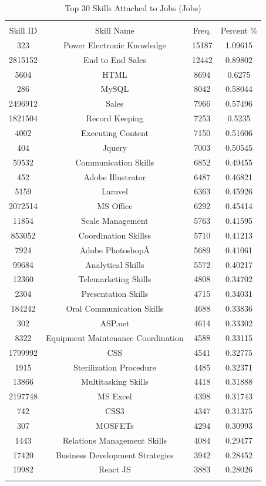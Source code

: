 \documentclass[12pt]{article}
\begin{document}
\begin{table}[]
    \caption{Top 30 Skills Attached to Jobs (Jobs)}
    \centering
    \begin{tabular}{cccc}
\hline
\hline
\vspace{-0.4cm}
\\

Skill ID & Skill Name & Freq.  & Percent \% \\
\hline
323 & Power Electronic Knowledge & 15187 & 1.09615 \\
2815152 & End to End Sales & 12442 & 0.89802 \\
5604 & HTML & 8694 & 0.6275 \\
286 & MySQL & 8042 & 0.58044 \\
2496912 & Sales & 7966 & 0.57496 \\
1821504 & Record Keeping & 7253 & 0.5235 \\
4002 & Executing Content & 7150 & 0.51606 \\
404 & Jquery & 7003 & 0.50545 \\
59532 & Communication Skills & 6852 & 0.49455 \\
452 & Adobe Illustrator & 6487 & 0.46821 \\
5159 & Laravel & 6363 & 0.45926 \\
2072514 & MS Office & 6292 & 0.45414 \\
11854 & Scale Management & 5763 & 0.41595 \\
853052 & Coordination Skillss & 5710 & 0.41213 \\
7924 & Adobe PhotoshopÂ & 5689 & 0.41061 \\
99684 & Analytical Skills & 5572 & 0.40217 \\
12360 & Telemarketing Skills & 4808 & 0.34702 \\
2304 & Presentation Skills & 4715 & 0.34031 \\
184242 & Oral Communication Skills & 4688 & 0.33836 \\
302 & ASP.net & 4614 & 0.33302 \\
8322 & Equipment Maintenance Coordination & 4588 & 0.33115 \\
1799992 & CSS & 4541 & 0.32775 \\
1915 & Sterilization Procedure & 4485 & 0.32371 \\
13866 & Multitasking Skills & 4418 & 0.31888 \\
2197748 & MS Excel & 4398 & 0.31743 \\
742 & CSS3 & 4347 & 0.31375 \\
307 & MOSFETs & 4294 & 0.30993 \\
1443 & Relations Management Skills & 4084 & 0.29477 \\
17420 & Business Development Strategies & 3942 & 0.28452 \\
19982 & React JS & 3883 & 0.28026 \\
\vspace{-0.4cm} \\
\hline 
\hline
    \end{tabular}
    \label{tab:jobs_t20skill}
\end{table}
\end{document}
